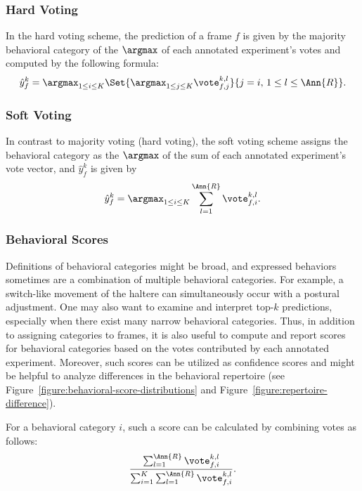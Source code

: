 \subsubsection{Hard Voting}
In the hard voting scheme, the prediction of a frame $f$ is given by the majority behavioral category of the $\argmax$ of each annotated experiment's votes and computed by the following formula:
\begin{equation}
	\hat{y}^k_f = \argmax_{1 \leq i \leq K} \Set{\argmax_{1 \leq j \leq K} { \vote_{f,j}^{k,l}}}{j=i, \, 1 \leq l \leq \Ann{R}}.
\end{equation}

\subsubsection{Soft Voting}
In contrast to majority voting (hard voting), the soft voting scheme assigns the behavioral category as the $\argmax$ of the sum of each annotated experiment's vote vector, and $\hat{y}^k_f$ is given by
\begin{equation}
	\hat{y}^k_f = \argmax_{1 \leq i \leq K} \sum_{l=1}^{\Ann{R}} \vote_{f,i}^{k,l}.
\end{equation}

\subsubsection{Behavioral Scores}
Definitions of behavioral categories might be broad, and expressed behaviors sometimes are a combination of multiple behavioral categories.
For example, a switch-like movement of the haltere can simultaneously occur with a postural adjustment.
One may also want to examine and interpret top-$k$ predictions, especially when there exist many narrow behavioral categories.
Thus, in addition to assigning categories to frames, it is also useful to compute and report scores for behavioral categories based on the votes contributed by each annotated experiment.
Moreover, such scores can be utilized as confidence scores and might be helpful to analyze differences in the behavioral repertoire (see Figure~\ref{figure:behavioral-score-distributions} and Figure~\ref{figure:repertoire-difference}).

For a behavioral category $i$, such a score can be calculated by combining votes as follows:
\begin{equation}
	\frac{\sum_{l=1}^{\Ann{R}} \vote_{f,i}^{k,l}}{\sum_{i = 1}^{K}\sum_{l=1}^{\Ann{R}} \vote_{f,i}^{k,l}}.
\end{equation}

